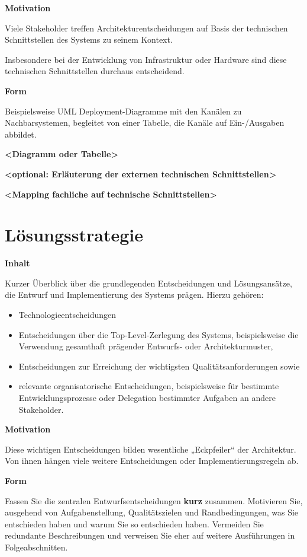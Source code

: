 \documentclass[
]{article}
\begin{document}
\textbf{Motivation}

Viele Stakeholder treffen Architekturentscheidungen auf Basis der
technischen Schnittstellen des Systems zu seinem Kontext.

Insbesondere bei der Entwicklung von Infrastruktur oder Hardware sind
diese technischen Schnittstellen durchaus entscheidend.

\textbf{Form}

Beispielsweise UML Deployment-Diagramme mit den Kanälen zu
Nachbarsystemen, begleitet von einer Tabelle, die Kanäle auf
Ein-/Ausgaben abbildet.

\textbf{\textless Diagramm oder Tabelle\textgreater{}}

\textbf{\textless optional: Erläuterung der externen technischen
Schnittstellen\textgreater{}}

\textbf{\textless Mapping fachliche auf technische
Schnittstellen\textgreater{}}

\section{Lösungsstrategie}\label{section-solution-strategy}

\textbf{Inhalt}

Kurzer Überblick über die grundlegenden Entscheidungen und
Lösungsansätze, die Entwurf und Implementierung des Systems prägen.
Hierzu gehören:

\begin{itemize}
\item
  Technologieentscheidungen
\item
  Entscheidungen über die Top-Level-Zerlegung des Systems,
  beispielsweise die Verwendung gesamthaft prägender Entwurfs- oder
  Architekturmuster,
\item
  Entscheidungen zur Erreichung der wichtigsten Qualitätsanforderungen
  sowie
\item
  relevante organisatorische Entscheidungen, beispielsweise für
  bestimmte Entwicklungsprozesse oder Delegation bestimmter Aufgaben an
  andere Stakeholder.
\end{itemize}

\textbf{Motivation}

Diese wichtigen Entscheidungen bilden wesentliche „Eckpfeiler`` der
Architektur. Von ihnen hängen viele weitere Entscheidungen oder
Implementierungsregeln ab.

\textbf{Form}

Fassen Sie die zentralen Entwurfsentscheidungen \textbf{kurz} zusammen.
Motivieren Sie, ausgehend von Aufgabenstellung, Qualitätszielen und
Randbedingungen, was Sie entschieden haben und warum Sie so entschieden
haben. Vermeiden Sie redundante Beschreibungen und verweisen Sie eher
auf weitere Ausführungen in Folgeabschnitten.
\end{document}

